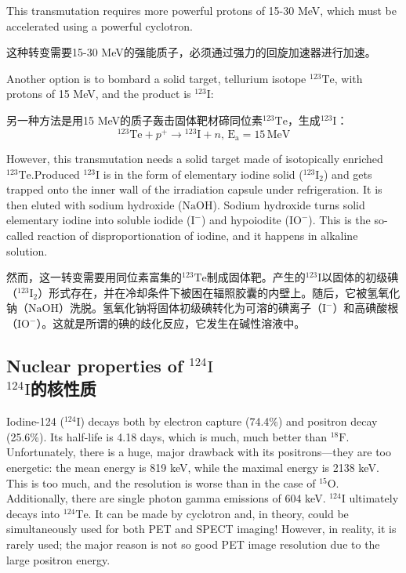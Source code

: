 \documentclass[dvipsnames, svgnames,a4paper,11pt]{article}
\begin{document}
This transmutation requires more powerful protons of 15-30 MeV, which must be accelerated using a powerful cyclotron.

这种转变需要15-30 MeV的强能质子，必须通过强力的回旋加速器进行加速。

Another option is to bombard a solid target, tellurium isotope \(\mathrm{^{123}Te}\), with protons of 15 MeV, and the product is \(\mathrm{^{123}I}\):

另一种方法是用15 MeV的质子轰击固体靶材碲同位素\(\mathrm{^{123}Te}\)，生成\(\mathrm{^{123}I}\)：
\[
\mathrm{^{123}Te} + p^{+} \rightarrow \mathrm{^{123}I} + n, \, \mathrm{E_a} = 15 \, \text{MeV}
\]

However, this transmutation needs a solid target made of isotopically enriched \(\mathrm{^{123}Te}\).Produced \(\mathrm{^{123}I}\) is in the form of elementary iodine solid (\(\mathrm{^{123}I_2}\)) and gets trapped onto the inner wall of the irradiation capsule under refrigeration. It is then eluted with sodium hydroxide (\(\mathrm{NaOH}\)). Sodium hydroxide turns solid elementary iodine into soluble iodide (\(\mathrm{I^{-}}\)) and hypoiodite (\(\mathrm{IO^{-}}\)). This is the so-called reaction of disproportionation of iodine, and it happens in alkaline solution.

然而，这一转变需要用同位素富集的\(\mathrm{^{123}Te}\)制成固体靶。产生的\(\mathrm{^{123}I}\)以固体的初级碘（\(\mathrm{^{123}I_2}\)）形式存在，并在冷却条件下被困在辐照胶囊的内壁上。随后，它被氢氧化钠（\(\mathrm{NaOH}\)）洗脱。氢氧化钠将固体初级碘转化为可溶的碘离子（\(\mathrm{I^{-}}\)）和高碘酸根（\(\mathrm{IO^{-}}\)）。这就是所谓的碘的歧化反应，它发生在碱性溶液中。

\subsection{Nuclear properties of \(\mathrm{^{124}I}\)\\ \(\mathrm{^{124}I}\)的核性质}  
Iodine-124 (\(\mathrm{^{124}I}\)) decays both by electron capture (74.4\%) and positron decay (25.6\%). Its half-life is 4.18 days, which is much, much better than \(\mathrm{^{18}F}\). Unfortunately, there is a huge, major drawback with its positrons—they are too energetic: the mean energy is 819 keV, while the maximal energy is 2138 keV. This is too much, and the resolution is worse than in the case of \(\mathrm{^{15}O}\). Additionally, there are single photon gamma emissions of 604 keV. \(\mathrm{^{124}I}\) ultimately decays into \(\mathrm{^{124}Te}\). It can be made by cyclotron and, in theory, could be simultaneously used for both PET and SPECT imaging! However, in reality, it is rarely used; the major reason is not so good PET image resolution due to the large positron energy.
\end{document}
